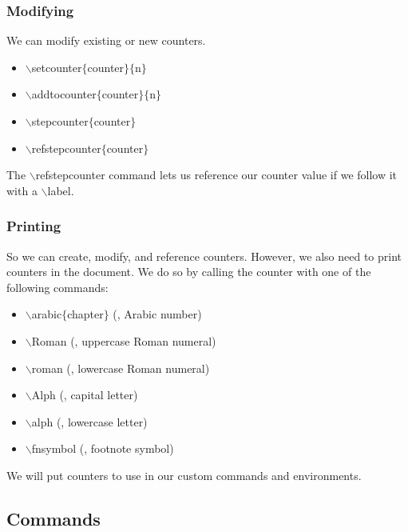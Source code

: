 \begin{frame}  \frametitle{Modifying}
We can modify existing or new counters.
\begin{itemize}
\item[] {\color{command}$\backslash$setcounter\color{braces}$\{${\color{black}counter}$\}\{${\color{black}n}$\}$}
\item[] {\color{command}$\backslash$addtocounter\color{braces}$\{${\color{black}counter}$\}\{${\color{black}n}$\}$}
\item[] {\color{command}$\backslash$stepcounter\color{braces}$\{${\color{black}counter}$\}$}
\item[] {\color{command}$\backslash$refstepcounter\color{braces}$\{${\color{black}counter}$\}$}
\end{itemize}
The {\color{command}$\backslash$refstepcounter} command lets us reference our counter value if we follow it with a {\color{command}$\backslash$label}.
\end{frame}

\begin{frame}  \frametitle{Printing}
So we can create, modify, and reference counters. However, we also need to print counters in the document. We do so by calling the counter with one of the following commands:
\setcounter{temp}{4}
\begin{itemize}
\item[] {\color{command}$\backslash$arabic}{\color{braces}$\{${\color{black}chapter}$\}$} (, Arabic number)
\item[] {\color{command}$\backslash$Roman} (, uppercase Roman numeral)
\item[] {\color{command}$\backslash$roman} (, lowercase Roman numeral)
\item[] {\color{command}$\backslash$Alph} (, capital letter)
\item[] {\color{command}$\backslash$alph} (, lowercase letter)
\item[] {\color{command}$\backslash$fnsymbol} (, footnote symbol)
\end{itemize}
We will put counters to use in our custom commands and environments.
\end{frame}

\subsection[Commands]{Commands}

